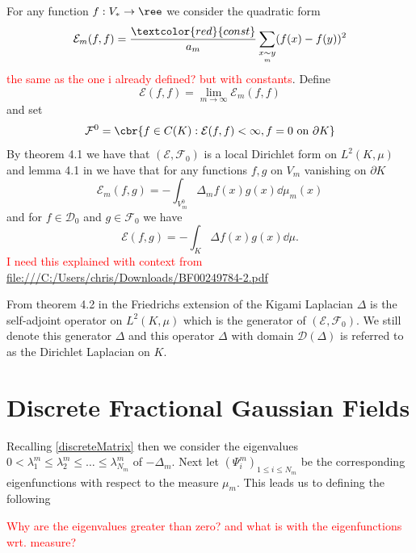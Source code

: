 For any function $f: V_{*} \to \ree$ we consider the quadratic form
\begin{equation}
	\mathcal{E}_{m}(f,f) = \frac{\textcolor{red}{const}}{a_m} \sum_{x \underset{m}{\sim} y} (f(x)-f(y))^2
\end{equation}
\textcolor{red}{the same as the one i already defined? but with constants}. Define
\begin{equation}
	\mathcal{E}(f,f) = \lim_{m \to \infty} \mathcal{E}_m(f,f)
\end{equation}
and set
\begin{equation}
	\mathcal{F}^{0} = \cbr{f \in C(K) : \mathcal{E}(f,f) < \infty, f = 0 \text{ on } \partial K}
\end{equation}
By theorem 4.1  we have that $(\mathcal{E}, \mathcal{F}_0)$ is a local Dirichlet form on $L^{2}(K, \mu)$ and lemma 4.1 in \cite{specAnal} we have that for any functions $f,g $ on $V_m$ vanishing on $\partial K$
\begin{equation}
	\mathcal{E}_m(f,g) = -\int_{V_m^{0}} \Delta_m f(x) g(x) \dd \mu_m(x)
\end{equation}
and for $f \in \mathcal{D}_0$ and $g \in \mathcal{F}_0$ we have
\begin{equation}
	\mathcal{E}(f,g) = - \int_{K} \Delta f(x) g(x) \dd \mu.
\end{equation}
\textcolor{red}{I need this explained with context from \url{file:///C:/Users/chris/Downloads/BF00249784-2.pdf}}

From theorem 4.2 in \cite{specAnal} the Friedrichs extension of the Kigami Laplacian $\Delta$ is the self-adjoint operator on $L^{2}(K, \mu)$ which is the generator of $(\mathcal{E}, \mathcal{F}_0)$. We still denote this generator $\Delta$ and this operator $\Delta$ with domain $\mathcal{D}(\Delta)$ is referred to as the Dirichlet Laplacian on $K$.


\section{Discrete Fractional Gaussian Fields}
Recalling \cref{discreteMatrix} then we consider the eigenvalues $0 < \lambda_1^{m} \leq \lambda_{2}^{m} \leq \ldots \leq \lambda_{N_m}^{m}$ of $-\Delta_m$. Next let $(\Psi_i^{m})_{1 \leq i \leq N_m}$ be the corresponding eigenfunctions with respect to the measure $\mu_m$. This leads us to defining the following

\textcolor{red}{Why are the eigenvalues greater than zero? and what is with the eigenfunctions wrt. measure?}

